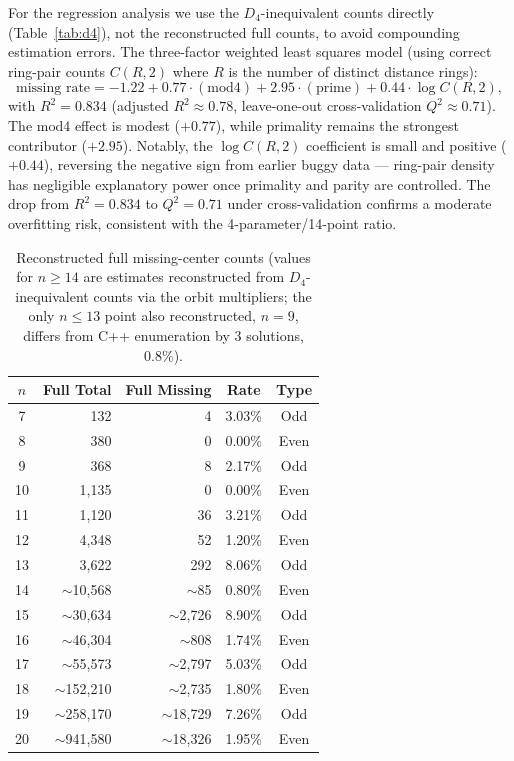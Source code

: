 \documentclass[11pt,a4paper]{article}
\theoremstyle{plain}
\theoremstyle{definition}
\begin{document}
For the regression analysis we use the $D_4$-inequivalent counts directly (Table~\ref{tab:d4}), not the reconstructed full counts, to avoid compounding estimation errors. The three-factor weighted least squares model (using correct ring-pair counts $C(R,2)$ where $R$ is the number of distinct distance rings):
\[
\text{missing rate} = -1.22 + 0.77\cdot(\text{mod4}) + 2.95\cdot(\text{prime}) + 0.44\cdot\log C(R,2),
\]
with $R^2 = 0.834$ (adjusted $R^2 \approx 0.78$, leave-one-out cross-validation $Q^2 \approx 0.71$). The $\text{mod4}$ effect is modest ($+0.77$), while primality remains the strongest contributor ($+2.95$). Notably, the $\log C(R,2)$ coefficient is small and positive ($+0.44$), reversing the negative sign from earlier buggy data --- ring-pair density has negligible explanatory power once primality and parity are controlled. The drop from $R^2=0.834$ to $Q^2=0.71$ under cross-validation confirms a moderate overfitting risk, consistent with the 4-parameter/14-point ratio.

\begin{table}[H]
\centering
\caption{Reconstructed full missing-center counts (values for $n\ge 14$ are estimates reconstructed from $D_4$-inequivalent counts via the orbit multipliers; the only $n\le13$ point also reconstructed, $n=9$, differs from C++ enumeration by 3 solutions, $0.8\%$).}
\label{tab:fullrecon}
\footnotesize
\begin{tabular}{crrcc}
\toprule
$n$ & Full Total & Full Missing & Rate & Type \\
\midrule
7 & 132 & 4 & 3.03\% & Odd \\
8 & 380 & 0 & 0.00\% & Even \\
9 & 368 & 8 & 2.17\% & Odd \\
10 & 1,135 & 0 & 0.00\% & Even \\
11 & 1,120 & 36 & 3.21\% & Odd \\
12 & 4,348 & 52 & 1.20\% & Even \\
13 & 3,622 & 292 & 8.06\% & Odd \\
14 & $\sim$10,568 & $\sim$85 & 0.80\% & Even \\
15 & $\sim$30,634 & $\sim$2,726 & 8.90\% & Odd \\
16 & $\sim$46,304 & $\sim$808 & 1.74\% & Even \\
17 & $\sim$55,573 & $\sim$2,797 & 5.03\% & Odd \\
18 & $\sim$152,210 & $\sim$2,735 & 1.80\% & Even \\
19 & $\sim$258,170 & $\sim$18,729 & 7.26\% & Odd \\
20 & $\sim$941,580 & $\sim$18,326 & 1.95\% & Even \\
\bottomrule
\end{tabular}
\end{table}
\end{document}
